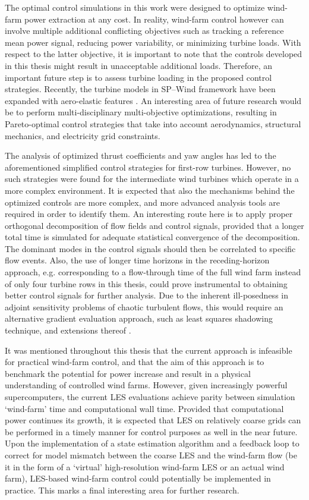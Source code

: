 The optimal control simulations in this work were designed to optimize wind-farm power extraction at any cost. In reality, wind-farm control however can involve multiple additional conflicting objectives such as tracking a reference mean power signal, reducing power variability, or minimizing turbine loads. With respect to the latter objective, it is important to note that the controls developed in this thesis might result in unacceptable additional loads. Therefore, an important future step is to assess turbine loading in the proposed control strategies. Recently, the turbine models in SP--Wind framework have been expanded with aero-elastic features \citep{vitsas2016multiscale}. An interesting area of future research would be to perform multi-disciplinary multi-objective optimizations, resulting in Pareto-optimal control strategies that take into account aerodynamics, structural mechanics, and electricity grid constraints.

The analysis of optimized thrust coefficients and yaw angles has led to the aforementioned simplified control strategies for first-row turbines. However, no such strategies were found for the intermediate wind turbines which operate in a more complex environment. It is expected that also the mechanisms behind the optimized controls are more complex, and more advanced analysis tools are required in order to identify them. An interesting route here is to apply proper orthogonal decomposition of flow fields and control signals, provided that a longer total time is simulated for adequate statistical convergence of the decomposition. The dominant modes in the control signals should then be correlated to specific flow events. Also, the use of longer time horizons in the receding-horizon approach, e.g. corresponding to a flow-through time of the full wind farm instead of only four turbine rows in this thesis, could prove instrumental to obtaining better control signals for further analysis. Due to the inherent ill-posedness in adjoint sensitivity problems of chaotic turbulent flows, this would require an alternative gradient evaluation approach, such as least squares shadowing technique, and extensions thereof \citep{wang2014least, chater2016simplified, blonigan2017multigrid}.

It was mentioned throughout this thesis that the current approach is infeasible for practical wind-farm control, and that the aim of this approach is to benchmark the potential for power increase and result in a physical understanding of controlled wind farms. However, given increasingly powerful supercomputers, the current LES evaluations achieve parity between simulation `wind-farm' time and computational wall time. Provided that computational power continues its growth, it is expected that LES on relatively coarse grids can be performed in a timely manner for control purposes as well in the near future. Upon the implementation of a state estimation algorithm and a feedback loop to correct for model mismatch between the coarse LES and the wind-farm flow (be it in the form of a `virtual' high-resolution wind-farm LES or an actual wind farm), LES-based wind-farm control could potentially be implemented in practice. This marks a final interesting area for further research.

